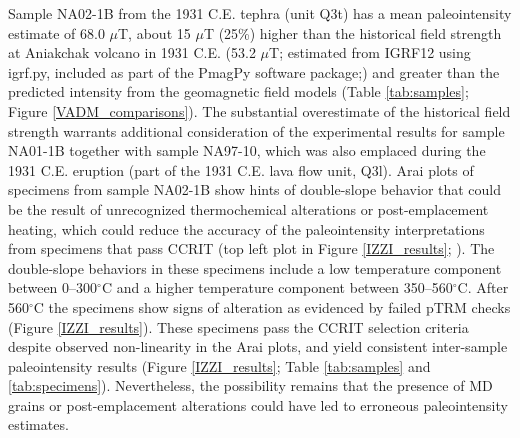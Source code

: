\documentclass[draft]{agujournal2019}
\begin{document}

Sample NA02-1B from the 1931 C.E. tephra (unit Q3t) has a mean paleointensity estimate of 68.0 $\mu$T, about 15 $\mu$T (25\%) higher than the historical field strength at Aniakchak volcano in 1931 C.E. (53.2 $\mu$T; estimated from IGRF12 using igrf.py, included as part of the PmagPy software package;\cite{Tauxe2016a}) and greater than the predicted intensity from the geomagnetic field models (Table \ref{tab:samples}; Figure \ref{VADM_comparisons}). The substantial overestimate of the historical field strength warrants additional consideration of the experimental results for sample NA01-1B together with sample NA97-10, which was also emplaced during the 1931 C.E. eruption (part of the 1931 C.E. lava flow unit, Q3l). Arai plots of specimens from sample NA02-1B show hints of double-slope behavior that could be the result of unrecognized thermochemical alterations or post-emplacement heating, which could reduce the accuracy of the paleointensity interpretations from specimens that pass CCRIT (top left plot in Figure \ref{IZZI_results}; ). The double-slope behaviors in these specimens include a low temperature component between 0–300$^{\circ}$C and a higher temperature component between 350–560$^{\circ}$C. After 560$^{\circ}$C the specimens show signs of alteration as evidenced by failed pTRM checks (Figure \ref{IZZI_results}). These specimens pass the CCRIT selection criteria despite observed non-linearity in the Arai plots, and yield consistent inter-sample paleointensity results (Figure \ref{IZZI_results}; Table \ref{tab:samples} and \ref{tab:specimens}). Nevertheless, the possibility remains that the presence of MD grains or post-emplacement alterations could have led to erroneous paleointensity estimates.   
\end{document}

